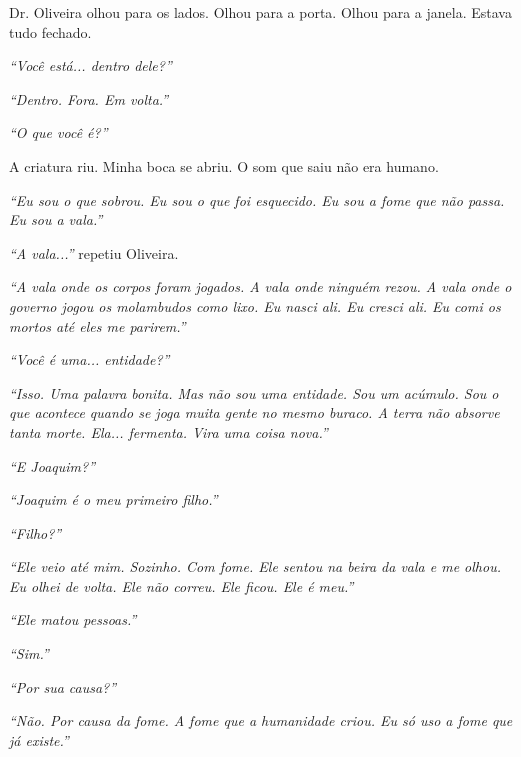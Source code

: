 \noindent Dr. Oliveira olhou para os lados. Olhou para a porta. Olhou para a janela. Estava tudo fechado.

\noindent \textit{\textquotedblleft{}Você está... dentro dele?\textquotedblright{}}

\noindent \textit{\textquotedblleft{}Dentro. Fora. Em volta.\textquotedblright{}}

\noindent \textit{\textquotedblleft{}O que você é?\textquotedblright{}}

\noindent A criatura riu. Minha boca se abriu. O som que saiu não era humano.

\noindent \textit{\textquotedblleft{}Eu sou o que sobrou. Eu sou o que foi esquecido. Eu sou a fome que não passa. Eu sou a vala.\textquotedblright{}}

\noindent \textit{\textquotedblleft{}A vala...\textquotedblright{}} repetiu Oliveira.

\noindent \textit{\textquotedblleft{}A vala onde os corpos foram jogados. A vala onde ninguém rezou. A vala onde o governo jogou os molambudos como lixo. Eu nasci ali. Eu cresci ali. Eu comi os mortos até eles me parirem.\textquotedblright{}}

\noindent \textit{\textquotedblleft{}Você é uma... entidade?\textquotedblright{}}

\noindent \textit{\textquotedblleft{}Isso. Uma palavra bonita. Mas não sou uma entidade. Sou um acúmulo. Sou o que acontece quando se joga muita gente no mesmo buraco. A terra não absorve tanta morte. Ela... fermenta. Vira uma coisa nova.\textquotedblright{}}

\noindent \textit{\textquotedblleft{}E Joaquim?\textquotedblright{}}

\noindent \textit{\textquotedblleft{}Joaquim é o meu primeiro filho.\textquotedblright{}}

\noindent \textit{\textquotedblleft{}Filho?\textquotedblright{}}

\noindent \textit{\textquotedblleft{}Ele veio até mim. Sozinho. Com fome. Ele sentou na beira da vala e me olhou. Eu olhei de volta. Ele não correu. Ele ficou. Ele é meu.\textquotedblright{}}

\noindent \textit{\textquotedblleft{}Ele matou pessoas.\textquotedblright{}}

\noindent \textit{\textquotedblleft{}Sim.\textquotedblright{}}

\noindent \textit{\textquotedblleft{}Por sua causa?\textquotedblright{}}

\noindent \textit{\textquotedblleft{}Não. Por causa da fome. A fome que a humanidade criou. Eu só uso a fome que já existe.\textquotedblright{}}

